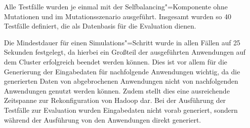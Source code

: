 Alle Testfälle wurden je einmal mit der Selfbalancing"=Komponente ohne Mutationen und im Mutationsszenario ausgeführt.
Insgesamt wurden so 40 Testfälle definiert, die als Datenbasis für die Evaluation dienen.

Die Mindestdauer für einen Simulations"=Schritt wurde in allen Fällen auf 25 Sekunden festgelegt, da hierbei ein Großteil der ausgeführten Anwendungen auf dem Cluster erfolgreich beendet werden können.
Dies ist vor allem für die Generierung der Eingabedaten für nachfolgende Anwendungen wichtig, da die generierten Daten von abgebrochenen Anwendungen nicht von nachfolgenden Anwendungen genutzt werden können.
Zudem stellt dies eine ausreichende Zeitspanne zur Rekonfiguration von Hadoop dar.
Bei der Ausführung der Testfälle zur Evaluation wurden Eingabedaten nicht vorab generiert, sondern während der Ausführung von den Anwendungen direkt generiert.
